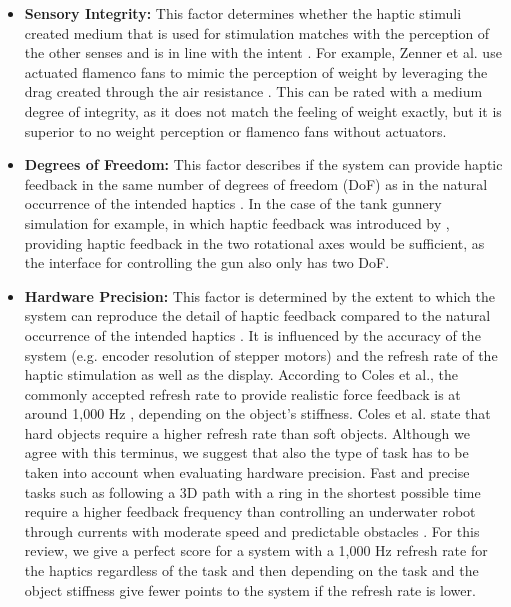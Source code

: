 \begin{itemize}
    \item \textbf{Sensory Integrity:}
    This factor determines whether the haptic stimuli created medium that is used for stimulation matches with the perception of the other senses and is in line with the intent \cite{Muender2022HapticReality}. For example, Zenner et al. use actuated flamenco fans to mimic the perception of weight by leveraging the drag created through the air resistance \cite{Zenner2019}. This can be rated with a medium degree of integrity, as it does not match the feeling of weight exactly, but it is superior to no weight perception or flamenco fans without actuators. 
    
    \item \textbf{Degrees of Freedom:}
    This factor describes if the system can provide haptic feedback in the same number of degrees of freedom (DoF) as in the natural occurrence of the intended haptics \cite{Muender2022HapticReality}. In the case of the tank gunnery simulation for example, in which haptic feedback was introduced by \cite{LiuG2014}, providing haptic feedback in the two rotational axes would be sufficient, as the interface for controlling the gun also only has two DoF.
    
    \item \textbf{Hardware Precision:}
    This factor is determined by the extent to which the system can reproduce the detail of haptic feedback compared to the natural occurrence of the intended haptics \cite{Muender2022HapticReality}. 
    It is influenced by the accuracy of the system (e.g. encoder resolution of stepper motors) and the refresh rate of the haptic stimulation as well as the display. According to Coles et al., the commonly accepted refresh rate to provide realistic force feedback is at around 1,000 Hz \cite{Coles2011TheArt}, depending on the object's stiffness. Coles et al. state that hard objects require a higher refresh rate than soft objects. Although we agree with this terminus, we suggest that also the type of task has to be taken into account when evaluating hardware precision. Fast and precise tasks such as following a 3D path with a ring in the shortest possible time \cite{Oquendo2024} require a higher feedback frequency than controlling an underwater robot through currents with moderate speed and predictable obstacles \cite{Xia2023}.
    For this review, we give a perfect score for a system with a 1,000 Hz refresh rate for the haptics regardless of the task and then depending on the task and the object stiffness give fewer points to the system if the refresh rate is lower.


\end{itemize}
